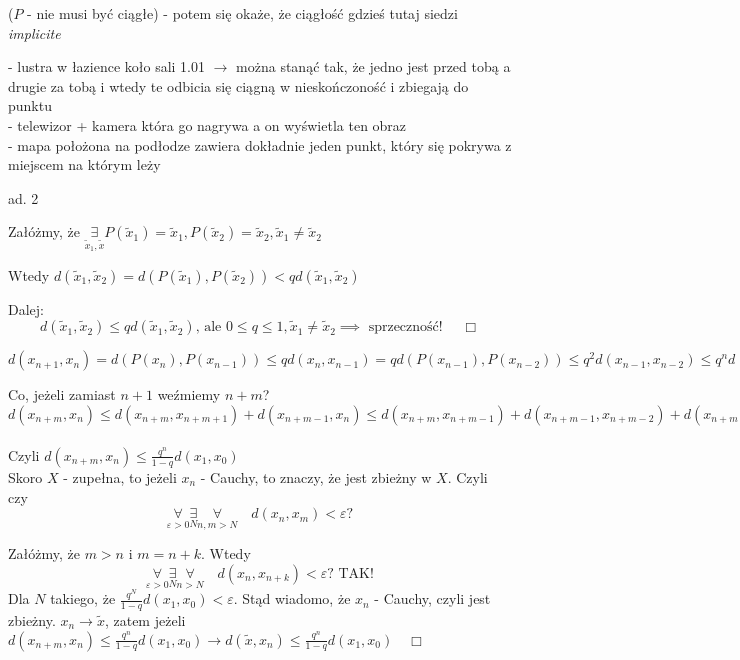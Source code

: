 \documentclass[../main.tex]{subfiles}
\begin{document}
($P$ - nie musi być ciągłe) - potem się okaże, że ciągłość gdzieś tutaj siedzi \textit{implicite}

\noindent- lustra w łazience koło sali 1.01 $\rightarrow$ można stanąć tak, że jedno jest przed tobą a drugie za tobą i wtedy te odbicia się ciągną w nieskończoność i zbiegają do punktu\\
- telewizor + kamera która go nagrywa a on wyświetla ten obraz\\
- mapa położona na podłodze zawiera dokładnie jeden punkt, który się pokrywa z miejscem na którym leży

\begin{dowod}
    ad. 2
\end{dowod}

Załóżmy, że $\underset{\tilde x_1, \tilde x}{\exists} P(\tilde x_1) = \tilde x_1, P(\tilde x_2) = \tilde x_2, \tilde x_1 \neq \tilde x_2$

Wtedy $d(\tilde x_1, \tilde x_2) = d(P(\tilde x_1),P(\tilde x_2)) < qd(\tilde x_1, \tilde x_2)$

Dalej:
$$d(\tilde x_1, \tilde x_2) \leq q d(\tilde x_1, \tilde x_2)\text{, ale }0\leq q \leq 1,\tilde x_1 \neq \tilde x_2 \implies \text{ sprzeczność! }\quad \Box$$

\begin{obserwacja}

\end{obserwacja}

$d(x_{n+1},x_n) = d(P(x_n),P(x_{n-1})) \leq qd(x_n, x_{n-1}) = qd(P(x_{n-1}),P(x_{n-2})) \leq q^2 d(x_{n-1},x_{n-2}) \leq q^n d(x_1,x_0)$

Co, jeżeli zamiast $n+1$ weźmiemy $n+m$?
$d(x_{n+m},x_n) \leq d(x_{n+m},x_{n+m+1}) + d(x_{n+m-1},x_n) \leq d(x_{n+m},x_{n+m-1}) + d(x_{n+m-1},x_{n+m-2}) + d(x_{n+m-2},x_n)\leq\dots\leq d(x_{n+m},x_{n+m-1}+\dots+d(x_{n+1},x_n)\leq (q^{n+m-1} + \dots + q^{n+2} + q^{n+1} + q^n)d(x_1,x_0) \leq q^n \left ( \frac{1-q^n}{1-q} \right ) d(x_1,x_0) \underset{0\leq q<1}{\leq} \frac{q^n}{1-q} d(x_1,x_0)$

Czyli $d(x_{n+m},x_n) \leq \frac{q^n}{1-q} d(x_1,x_0)$\\
Skoro $X$ - zupełna, to jeżeli $x_n$ - Cauchy, to znaczy, że jest zbieżny w $X$.
Czyli czy
$$\underset{\varepsilon>0}{\forall}\underset{N}{\exists}\underset{n,m>N}{\forall}\quad d(x_n,x_m) <\varepsilon ?$$

Załóżmy, że $m>n$ i $m=n+k$. Wtedy
$$\underset{\varepsilon>0}{\forall}\underset{N}{\exists}\underset{n>N}{\forall}\quad d(x_n,x_{n+k}) < \varepsilon? \text{ TAK!}$$
Dla $N$ takiego, że $\frac{q^N}{1-q} d(x_1,x_0) < \varepsilon$. Stąd wiadomo, że $x_n$ - Cauchy, czyli jest zbieżny. $x_n \to \tilde x$, zatem jeżeli $d(x_{n+m},x_n)\leq \frac{q^n}{1-q} d(x_1,x_0) \rightarrow d(\tilde x,x_n) \leq \frac{q^n}{1-q} d(x_1,x_0) \quad \Box$
\end{document}
